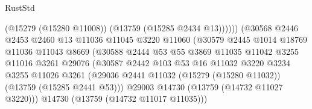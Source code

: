 \begin{lexlean}{RustStd}
\begin{coremodule}
                                              (@15279 (@15280 @11008))
                                              (@13759 (@15285 @2434 @13))))))
                                      (@30568
                                        @2446
                                        @2453
                                        @2460
                                        @13
                                        @11036
                                        @11045
                                        @3220
                                        @11060
                                        (@30579
                                          @2445
                                          @1014
                                          @18769
                                          @11036
                                          @11043
                                          @8669
                                          (@30588
                                            @2444
                                            @53
                                            @55
                                            @3869
                                            @11035
                                            @11042
                                            @3255
                                            @11016
                                            @3261
                                            @29076
                                            (@30587
                                              @2442
                                              @103
                                              @53
                                              @16
                                              @11032
                                              @3220
                                              @3234
                                              @3255
                                              @11026
                                              @3261
                                              (@29036
                                                @2441
                                                @11032
                                                (@15279 (@15280 @11032))
                                                (@13759 (@15285 @2441 @53)))
                                              @29003
                                              @14730
                                              (@13759 (@14732 @11027 @3220)))
                                            @14730
                                            (@13759 (@14732 @11017 @11035)))

\end{coremodule}
\end{lexlean}
